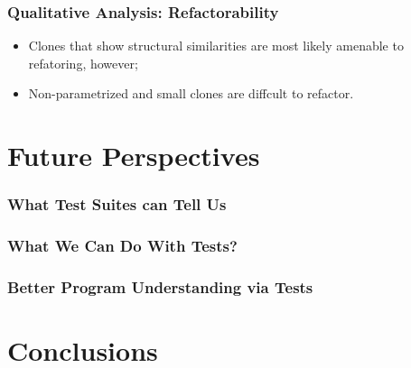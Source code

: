 \documentclass{beamer}
\begin{document}
\begin{frame}
\frametitle{Qualitative Analysis: Refactorability} {
   \Large
   \begin{itemize}
      \item Clones that show structural similarities are most likely amenable to
         refatoring, however;
         \vspace{0.5cm}
      \item Non-parametrized and small clones are diffcult to refactor.
   \end{itemize}    
}
\end{frame}

\section{Future Perspectives}

\begin{frame}
  \frametitle{What Test Suites can Tell Us}
\end{frame}

\begin{frame}
  \frametitle{What We Can Do With Tests?}
\end{frame}

\begin{frame}
  \frametitle{Better Program Understanding via Tests}
\end{frame}

\section{Conclusions}
\end{document}
